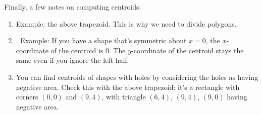 \documentclass[11pt,paper=letter]{scrartcl}
\begin{document}
Finally, a few notes on computing centroids:
\begin{enumerate}
  \item {} Example: the above trapezoid. This is why we need to divide polygons.
  \item {}. Example: If you have a shape that's symmetric about $x=0$, the $x$-coordinate of the centroid is $0$. The $y$-coordinate of the centroid stays the same even if you ignore the left half.
  \item You can find centroids of shapes with holes by considering the holes as having negative area. Check this with the above trapezoid: it's a rectangle with corners $(0, 0)$ and $(9, 4)$, with triangle $(6, 4)$, $(9, 4)$, $(9, 0)$ having negative area.
\end{enumerate}
\end{document}
